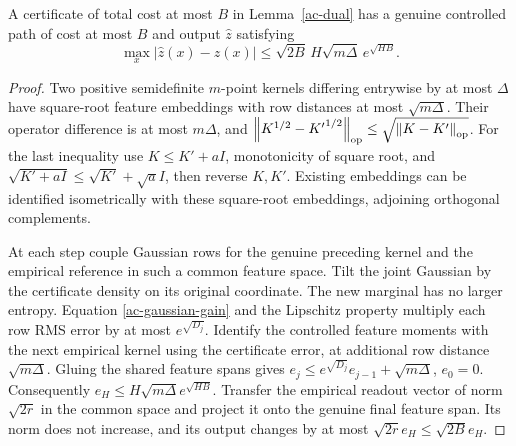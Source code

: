 \begin{lemma}\label{ac-repair}
A certificate of total cost at most $B$ in Lemma~\ref{ac-dual}
has a genuine controlled path of cost at most $B$ and output
$\widehat z$ satisfying
\[
 \max_x|\widehat z(x)-z(x)|
            \le\sqrt{2B}\,H\sqrt{m\Delta}\,e^{\sqrt{HB}}.
\]
\end{lemma}
\begin{proof}
Two positive semidefinite $m$-point kernels differing entrywise by
at most $\Delta$ have square-root feature embeddings with row
distances at most $\sqrt{m\Delta}$. Their operator difference is
at most $m\Delta$, and
$\left\lVert K^{1/2}-{K'}^{1/2}\right\rVert_{\rm op}
\le\sqrt{\left\lVert K-K'\right\rVert_{\rm op}}$.
For the last inequality use $K\le K'+aI$, monotonicity of square
root, and $\sqrt{K'+aI}\le\sqrt{K'}+\sqrt a I$, then reverse
$K,K'$. Existing embeddings can be identified isometrically with
these square-root embeddings, adjoining orthogonal complements.

At each step couple Gaussian rows for the genuine preceding kernel
and the empirical reference in such a common feature space. Tilt
the joint Gaussian by the certificate density on its original
coordinate. The new marginal has no larger entropy. Equation
\eqref{ac-gaussian-gain} and the Lipschitz property multiply each
row RMS error by at most $e^{\sqrt{D_j}}$. Identify the controlled
feature moments with the next empirical kernel using the certificate
error, at additional row distance $\sqrt{m\Delta}$. Gluing the
shared feature spans gives
$e_j\le e^{\sqrt{D_j}}e_{j-1}+\sqrt{m\Delta}$, $e_0=0$.
Consequently $e_H\le H\sqrt{m\Delta}e^{\sqrt{HB}}$.
Transfer the empirical readout vector of norm $\sqrt{2r}$ in the
common space and project it onto the genuine final feature span.
Its norm does not increase, and its output changes by at most
$\sqrt{2r}e_H\le\sqrt{2B}e_H$.
\end{proof}

